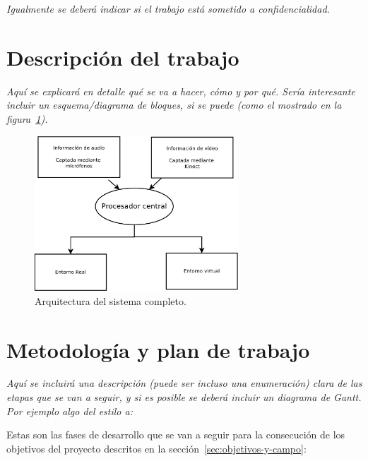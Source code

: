 \textit{Igualmente se deberá indicar si el trabajo está sometido a confidencialidad.}

\section{Descripción del trabajo}
\label{sec:descr-del-trab}

\textit{Aquí se explicará en detalle qué se va a hacer, cómo y por qué. Sería interesante incluir un esquema/diagrama de bloques, si se puede (como el mostrado en la figura~\ref{fig:arquitectura}).}


\begin{figure}[tphb]
  \centering
  \includegraphics[width=3in]{Diagrama2.pdf}
  \caption{Arquitectura del sistema completo.}
  \label{fig:arquitectura}
\end{figure}


\section{Metodología y plan de trabajo}
\label{sec:metodologia-y-plan}

\textit{Aquí se incluirá una descripción (puede ser incluso una enumeración)
  clara de las etapas que se van a seguir, y si es posible se deberá
  incluir un diagrama de Gantt. Por ejemplo algo del estilo a:}

Estas son las fases de desarrollo que se van a seguir para la
consecución de los objetivos del proyecto descritos en la sección~\ref{sec:objetivos-y-campo}:

